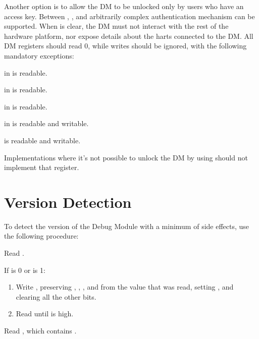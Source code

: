 Another option is to allow the DM to be unlocked only by users who have an
access key. Between \FdmDmstatusAuthenticated, \FdmDmstatusAuthbusy, and \RdmAuthdata arbitrarily
complex authentication mechanism can be supported.  When \FdmDmstatusAuthenticated is
clear, the DM must not interact with the rest of the hardware platform, nor expose
details about the harts connected to the DM. All DM registers should read 0,
while writes should be ignored, with the following mandatory exceptions:
\begin{steps}{}
    \item \FdmDmstatusAuthenticated in \RdmDmstatus is readable.
    \item \FdmDmstatusAuthbusy in \RdmDmstatus is readable.
    \item \FdmDmstatusVersion in \RdmDmstatus is readable.
    \item \FdmDmcontrolDmactive in \RdmDmcontrol is readable and writable.
    \item \RdmAuthdata is readable and writable.
\end{steps}

Implementations where it's not possible to unlock the DM by using \RdmAuthdata
should not implement that register.

\section{Version Detection}

\begin{steps}{To detect the version of the Debug Module with a minimum of side
    effects, use the following procedure:}
    \item Read \RdmDmcontrol.
    \item
        If \FdmDmcontrolDmactive is 0 or \FdmDmcontrolNdmreset is 1:
        \begin{enumerate}[nolistsep]
            \item Write \RdmDmcontrol, preserving \FdmDmcontrolHartreset,
            \FdmDmcontrolHasel, \FdmDmcontrolHartsello, and
            \FdmDmcontrolHartselhi from the value that was read, setting
            \FdmDmcontrolDmactive, and clearing all the other bits.
            \item Read \RdmDmcontrol until \FdmDmcontrolDmactive is high.
        \end{enumerate}
    \item Read \RdmDmstatus, which contains \FdmDmstatusVersion.
\end{steps}

